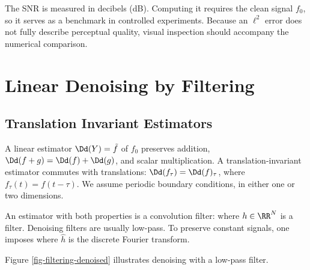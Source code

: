 The SNR is measured in decibels (dB). Computing it requires the clean signal $f_0$, so it serves as a benchmark in controlled experiments. Because an $\ell^2$ error does not fully describe perceptual quality, visual inspection should accompany the numerical comparison.




                                                     
                                                     
                                                     
\section{Linear Denoising by Filtering}
\label{sec-linear-denoising}

                                                     
\subsection{Translation Invariant Estimators}

A linear estimator $\Dd(Y) = \tilde f$ of $f_0$ preserves addition, $\Dd(f+g) = \Dd(f)+\Dd(g)$, and scalar multiplication.
A translation-invariant estimator commutes with translations: $\Dd(f_\tau) = \Dd(f)_\tau$, where $f_\tau(t) = f(t-\tau)$. We assume periodic boundary conditions, in either one or two dimensions.
 
An estimator with both properties is a convolution filter:
where $h\in\RR^N$ is a filter. Denoising filters are usually low-pass. To preserve constant signals, one imposes
where $\hat h$ is the discrete Fourier transform. 

Figure \ref{fig-filtering-denoised} illustrates denoising with a low-pass filter.


